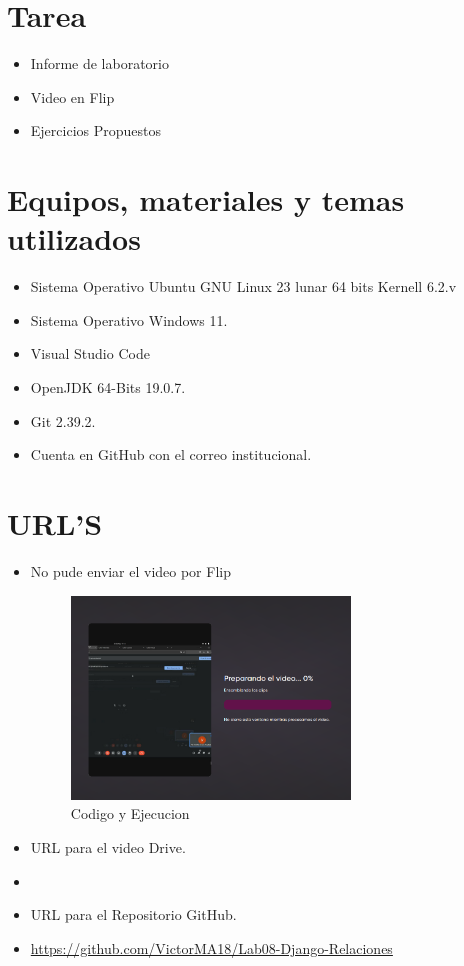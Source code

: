 \documentclass{article}
\begin{document}
	\section{Tarea}
	\begin{itemize}		
		\item Informe de laboratorio
        \item Video en Flip
        \item Ejercicios Propuestos
	\end{itemize}
		
	\section{Equipos, materiales y temas utilizados}
	\begin{itemize}
		\item Sistema Operativo Ubuntu GNU Linux 23 lunar 64 bits Kernell 6.2.v
		\item Sistema Operativo Windows 11.
		\item Visual Studio Code
		\item OpenJDK 64-Bits 19.0.7.
		\item Git 2.39.2.
		\item Cuenta en GitHub con el correo institucional.	
	\end{itemize}
	
	\section{URL'S}
	\begin{itemize}
        \item No pude enviar el video por Flip
        \begin{figure}[H]
            \centering
            \includegraphics[width=0.7\textwidth]{img/Flip.png}
            \caption{Codigo y Ejecucion}
        \end{figure}
        \item URL para el video Drive.
        \item \url{}
		\item URL para el Repositorio GitHub.
		\item \url{https://github.com/VictorMA18/Lab08-Django-Relaciones}
	\end{itemize}
	
\end{document}

